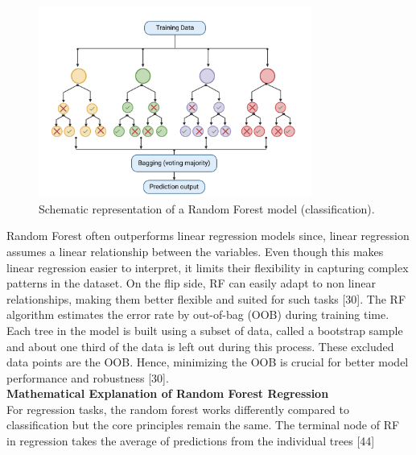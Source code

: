 \documentclass[12pt,a4paper]{report}
\begin{document}
\begin{figure}[h]
    \centering
    \includegraphics[width=0.8\textwidth]{Figures/rf.png}
    \caption{Schematic representation of a Random Forest model (classification).}
    \label{fig:rf}
\end{figure}

Random Forest often outperforms linear regression models since, linear regression assumes a linear relationship between the variables. Even though this makes linear regression easier to interpret, it limits their flexibility in capturing complex patterns in the dataset. 
On the flip side, RF can easily adapt to non linear relationships, making them better flexible and suited for such tasks [30]. The RF algorithm estimates the error rate by out-of-bag (OOB) during training time. Each tree in the model is built using a subset of data, called a 
bootstrap sample and about one third of the data is left out during this process. These excluded data points are the OOB. Hence, minimizing the OOB is crucial for better model performance and robustness [30]. \\

\textbf{Mathematical Explanation of Random Forest Regression} \\
For regression tasks, the random forest works differently compared to classification but the core principles remain the same. The terminal node of RF in regression takes the average of predictions from the individual trees [44]
\end{document}
